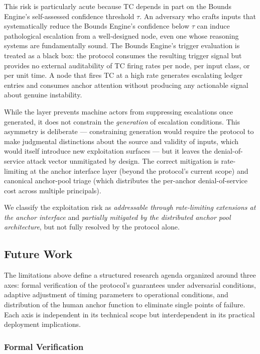 This risk is particularly acute because TC depends in part on the Bounds Engine's self-assessed confidence threshold $\tau$. An adversary who crafts inputs that systematically reduce the Bounds Engine's confidence below $\tau$ can induce pathological escalation from a well-designed node, even one whose reasoning systems are fundamentally sound. The Bounds Engine's trigger evaluation is treated as a black box: the protocol consumes the resulting trigger signal but provides no external auditability of TC firing rates per node, per input class, or per unit time. A node that fires TC at a high rate generates escalating ledger entries and consumes anchor attention without producing any actionable signal about genuine instability.

While the \fact{} layer prevents machine actors from suppressing escalations once generated, it does not constrain the \emph{generation} of escalation conditions. This asymmetry is deliberate --- constraining generation would require the protocol to make judgmental distinctions about the source and validity of inputs, which would itself introduce new exploitation surfaces --- but it leaves the denial-of-service attack vector unmitigated by design. The correct mitigation is rate-limiting at the anchor interface layer (beyond the protocol's current scope) and canonical anchor-pool triage (which distributes the per-anchor denial-of-service cost across multiple principals).

We classify the exploitation risk as \emph{addressable through rate-limiting extensions at the anchor interface} and \emph{partially mitigated by the distributed anchor pool architecture}, but not fully resolved by the protocol alone.

\subsection{Future Work}\label{sec:future-work}

The limitations above define a structured research agenda organized around three axes: formal verification of the protocol's guarantees under adversarial conditions, adaptive adjustment of timing parameters to operational conditions, and distribution of the human anchor function to eliminate single points of failure. Each axis is independent in its technical scope but interdependent in its practical deployment implications.

\subsubsection{Formal Verification}
\label{sec:fw:verification}

